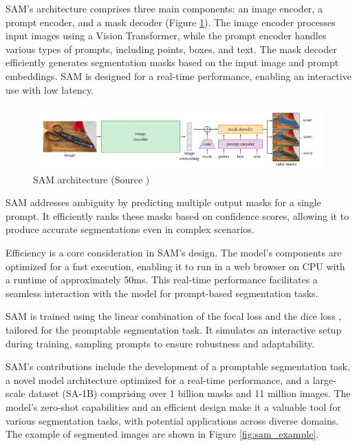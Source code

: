 SAM's architecture comprises three main components: an image encoder, a prompt encoder, and a mask decoder (Figure \ref{fig:sam_architecture}). The
image encoder processes input images using a Vision Transformer, while the prompt encoder handles various types of
prompts, including points, boxes, and text. The mask decoder efficiently generates segmentation masks based on the
input image and prompt embeddings. SAM is designed for a real-time performance, enabling an interactive use with low
latency.

\begin{figure}[h]
  \centering
  \includegraphics[width=\linewidth]{text/chapter_03/imgs/sam}
  \caption{SAM architecture (Source \cite{SAM2023})}
  \label{fig:sam_architecture}
\end{figure}

SAM addresses ambiguity by predicting multiple output masks for a single prompt. It efficiently ranks these masks based on confidence scores, allowing it to produce accurate segmentations even in complex scenarios.

Efficiency is a core consideration in SAM's design. The model's components are optimized for a fast execution,
enabling it to run in a web browser on CPU with a runtime of approximately 50ms. This real-time performance
facilitates a seamless interaction with the model for prompt-based segmentation tasks.

SAM is trained using the linear combination of the focal loss \cite{FocalLoss2020} and the dice loss \cite{DiceLoss2016},
tailored for the
promptable segmentation
task. It simulates an interactive setup during training, sampling prompts to ensure robustness and adaptability.

SAM's contributions include the development of a promptable segmentation task, a novel model architecture optimized
for a real-time performance, and a large-scale dataset (SA-1B) comprising over 1 billion masks and 11 million images.
The model's zero-shot capabilities and an efficient design make it a valuable tool for various segmentation tasks, with
potential applications across diverse domains. The example of segmented images are shown in Figure \ref{fig:sam_example}.

